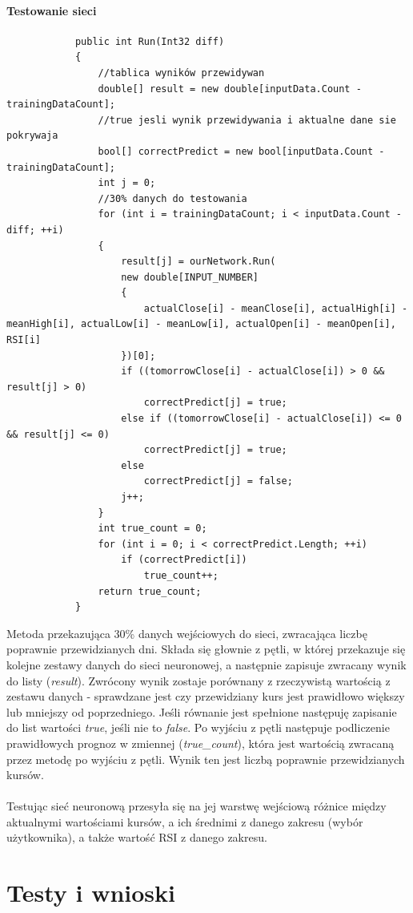 \documentclass[a4paper]{article}
\begin{document}
	\subsection{Testowanie sieci}
		\begin{lstlisting}
			public int Run(Int32 diff)
			{
				//tablica wyników przewidywan
				double[] result = new double[inputData.Count - trainingDataCount];
				//true jesli wynik przewidywania i aktualne dane sie pokrywaja
				bool[] correctPredict = new bool[inputData.Count - trainingDataCount];
				int j = 0;
				//30% danych do testowania
				for (int i = trainingDataCount; i < inputData.Count - diff; ++i)
				{
					result[j] = ourNetwork.Run(
					new double[INPUT_NUMBER]
					{
						actualClose[i] - meanClose[i], actualHigh[i] - meanHigh[i], actualLow[i] - meanLow[i], actualOpen[i] - meanOpen[i], RSI[i]
					})[0];
					if ((tomorrowClose[i] - actualClose[i]) > 0 && result[j] > 0)
						correctPredict[j] = true;
					else if ((tomorrowClose[i] - actualClose[i]) <= 0 && result[j] <= 0)
						correctPredict[j] = true;
					else
						correctPredict[j] = false;
					j++;
				}
				int true_count = 0;
				for (int i = 0; i < correctPredict.Length; ++i)
					if (correctPredict[i])
						true_count++;
				return true_count;
			}
		\end{lstlisting}
		Metoda przekazująca 30\% danych wejściowych do sieci, zwracająca liczbę poprawnie przewidzianych dni. Składa się głownie z pętli, w której przekazuje się kolejne zestawy danych do sieci neuronowej, a następnie zapisuje zwracany wynik do listy (\textit{result}). Zwrócony wynik zostaje porównany z rzeczywistą wartością z zestawu danych - sprawdzane jest czy przewidziany kurs jest prawidłowo większy lub mniejszy od poprzedniego. Jeśli równanie jest spełnione następuję zapisanie do list wartości \textit{true}, jeśli nie to \textit{false}. Po wyjściu z pętli następuje podliczenie prawidłowych prognoz  w zmiennej (\textit{true\_count}), która jest wartością zwracaną przez metodę po wyjściu z pętli. Wynik ten jest liczbą poprawnie przewidzianych kursów.\\\\
		Testując sieć neuronową przesyła się na jej warstwę wejściową różnice między aktualnymi wartościami kursów, a ich średnimi z danego zakresu (wybór użytkownika), a także wartość RSI z danego zakresu.
		\part{Testy i wnioski}
		
\end{document}
